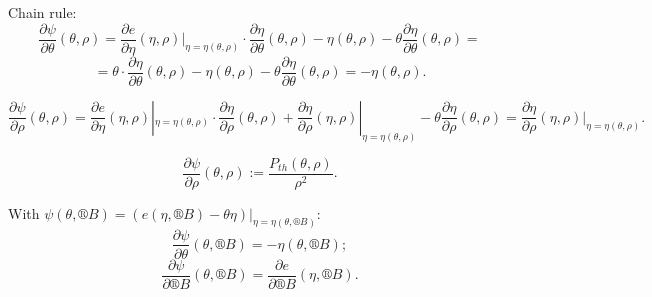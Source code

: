 \documentclass[12pt]{article}					%
\begin{document}
\begin{dusledek}
	Chain rule:
	$$ \frac{\partial \psi}{\partial \theta}(\theta, \rho) = \frac{\partial e}{\partial \eta}(\eta, \rho)|_{\eta=\eta(\theta, \rho)} · \frac{\partial \eta}{\partial \theta}(\theta, \rho) - \eta(\theta, \rho) - \theta \frac{\partial \eta}{\partial \theta}(\theta, \rho) =  $$
	$$ = \theta · \frac{\partial \eta}{\partial \theta}(\theta, \rho) - \eta(\theta, \rho) - \theta \frac{\partial \eta}{\partial \theta}(\theta, \rho) = -\eta(\theta, \rho). $$

	$$ \frac{\partial \psi}{\partial \rho}(\theta, \rho) = \frac{\partial e}{\partial \eta}(\eta, \rho)|_{\eta=\eta(\theta, \rho)} · \frac{\partial \eta}{\partial \rho}(\theta, \rho) + \frac{\partial\eta}{\partial \rho}(\eta, \rho)|_{\eta = \eta(\theta, \rho)} - \theta \frac{\partial \eta}{\partial \rho}(\theta, \rho) = \frac{\partial\eta}{\partial \rho}(\eta, \rho)|_{\eta = \eta(\theta, \rho)}. $$

	\begin{poznamkain}
		$$ \frac{\partial \psi}{\partial \rho}(\theta, \rho) := \frac{P_{th}(\theta, \rho)}{\rho^2}. $$
	\end{poznamkain}

	With $\psi(\theta, ®B) = (e(\eta, ®B) - \theta \eta)|_{\eta = \eta(\theta, ®B)}$:
	$$ \frac{\partial \psi}{\partial \theta}(\theta, ®B) = -\eta(\theta, ®B); $$
	$$ \frac{\partial \psi}{\partial ®B}(\theta, ®B) = \frac{\partial e}{\partial ®B}(\eta, ®B). $$
\end{dusledek}
\end{document}
